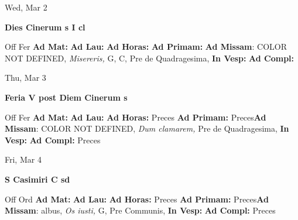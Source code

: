 \documentclass[10pt]{book}
\begin{document}
\begin{center}
\begin{minipage}{3.5in}
\vspace{2em}
\begin{center}Wed, Mar 2
\end{center}
\textbf{ \large Dies Cinerum
\textnormal{\normalsize s I cl}}

\begin{justify}Off Fer
\textbf{Ad Mat: }
\textbf{Ad Lau: }
\textbf{Ad Horas: }
\textbf{Ad Primam: }\textbf{Ad Missam}: COLOR NOT DEFINED, \textit{Misereris,} G, C, Pre de Quadragesima, 
\textbf{In Vesp: }
\textbf{Ad Compl: }
\end{justify}
\end{minipage}
\end{center}

\begin{center}
\begin{minipage}{3.5in}
\vspace{2em}
\begin{center}Thu, Mar 3
\end{center}
\textbf{ \large Feria V post Diem Cinerum
\textnormal{\normalsize s}}

\begin{justify}Off Fer
\textbf{Ad Mat: }
\textbf{Ad Lau: }
\textbf{Ad Horas: }Preces
\textbf{Ad Primam: }Preces\textbf{Ad Missam}: COLOR NOT DEFINED, \textit{Dum clamarem,} Pre de Quadragesima, 
\textbf{In Vesp: }
\textbf{Ad Compl: }Preces
\end{justify}
\end{minipage}
\end{center}

\begin{center}
\begin{minipage}{3.5in}
\vspace{2em}
\begin{center}Fri, Mar 4
\end{center}
\textbf{ \large S Casimiri C
\textnormal{\normalsize sd}}

\begin{justify}Off Ord
\textbf{Ad Mat: }
\textbf{Ad Lau: }
\textbf{Ad Horas: }Preces
\textbf{Ad Primam: }Preces\textbf{Ad Missam}: albus, \textit{Os iusti,} G, Pre Communis, 
\textbf{In Vesp: }
\textbf{Ad Compl: }Preces
\end{justify}
\end{minipage}
\end{center}
\end{document}
